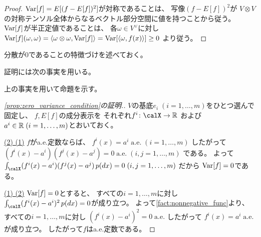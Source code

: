 \documentclass[report]{jlreq}
\begin{document}
\begin{proof}
    $\operatorname{Var}[f] = E[(f - E[f])^2]$が対称であることは、
    写像$(f - E[f])^2$が
    $V \otimes V$の対称テンソル全体からなるベクトル部分空間に値を持つことから従う。
    $\operatorname{Var}[f]$が半正定値であることは、
    各$\omega \in V^\vee$に対し
    $\operatorname{Var}[f](\omega, \omega)
        = \langle \omega \otimes \omega, \operatorname{Var}[f] \rangle
        = \operatorname{Var}[\langle \omega, f(x) \rangle]
        \ge 0$
    より従う。
\end{proof}

分散が0であることの特徴づけを述べておく。


証明には次の事実を用いる。


上の事実を用いて命題を示す。

\begin{proof}[\cref{prop:zero_variance_condition}の証明.]
    $V$の基底$e_i \; (i = 1, \dots, m)$をひとつ選んで固定し、
    $f, E[f]$の成分表示を
    それぞれ$f^i \colon \calX \to \R$
    および
    $a^i \in \mathbb{R} \; (i = 1, \dots, m)$とおいておく。

    \uline{(2) \Rightarrow (1)} \quad
    $f$がa.e.定数ならば、
    $f^i(x) = a^i \;
        \text{a.e.} \;
        (i = 1, \dots, m)$
    したがって
    $(f^i(x) - a^i)(f^j(x) - a^j) = 0 \;
        \text{a.e.} \;
        (i, j = 1, \dots, m)$
    である。
    よって
    $\int_\calX (f^i(x) - a^i)(f^j(x) - a^j) \, p(dx) = 0 \;
        (i, j = 1, \dots, m)$
    だから
    $\operatorname{Var}[f] = 0$である。

    \uline{(1) \Rightarrow (2)} \quad
    $\operatorname{Var}[f] = 0$とすると、
    すべての$i = 1, \dots, m$に対し
    $\int_\calX (f^i(x) - a^i)^2 \, p(dx) = 0$が成り立つ。
    よって\cref{fact:nonnegative_func}より、
    すべての$i = 1, \dots, m$に対し
    $(f^i(x) - a^i)^2 = 0 \;
        \text{a.e.}$
    したがって
    $f^i(x) = a^i \;
        \text{a.e.}$
    が成り立つ。
    したがって$f$はa.e.定数である。
\end{proof}
\end{document}
